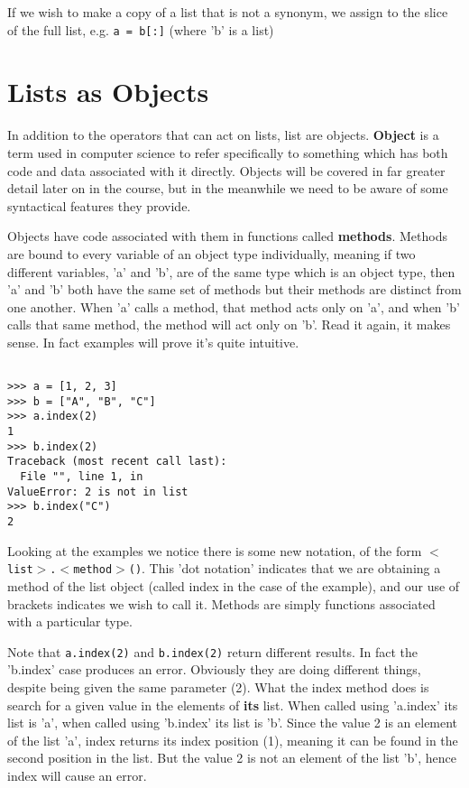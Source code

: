 If we wish to make a copy of a list that is not a synonym, we assign   to the slice of the full list, e.g. 
\texttt{a = b[:]} (where 'b' is   a list)

\section{Lists as Objects}

In addition to the operators that can act on lists, list are   objects. \textbf{Object} is a term used in computer science to   refer specifically to something which has both code and data associated   with it directly. Objects will be covered in far greater detail later   on in the course, but in the meanwhile we need to be aware of some   syntactical features they provide.

Objects have code associated with them in functions called   \textbf{methods}. Methods are bound to every variable of an   object type individually, meaning if two different variables, 'a' and   'b', are of the same type which is an object type, then 'a' and 'b'   both have the same set of methods but their methods are distinct from   one another. When 'a' calls a method, that method acts only on 'a', and   when 'b' calls that same method, the method will act only on 'b'. Read   it again, it makes sense. In fact examples will prove it's quite   intuitive.
\begin{lstlisting}

>>> a = [1, 2, 3]
>>> b = ["A", "B", "C"]
>>> a.index(2)
1
>>> b.index(2)
Traceback (most recent call last):
  File "", line 1, in 
ValueError: 2 is not in list
>>> b.index("C")
2
\end{lstlisting}

Looking at the examples we notice there is some new notation, of the   form 
\texttt{$<$list$>$.$<$method$>$()}. This 'dot notation'   indicates that we are obtaining a method of the list object (called   index in the case of the example), and our use of brackets indicates we   wish to call it.     Methods are simply functions associated with a particular type.    

Note that 
\texttt{a.index(2)} and 
\texttt{b.index(2)} return   different results. In fact the 'b.index' case produces an error.   Obviously they are doing different things, despite being given the same   parameter (2). What the index method does is search for a given value   in the elements of \textbf{its} list. When called using   'a.index' its list is 'a', when called using 'b.index' its list is 'b'.   Since the value 2 is an element of the list 'a', index returns its   index position (1), meaning it can be found in the second position in   the list. But the value 2 is not an element of the list 'b', hence   index will cause an error.

